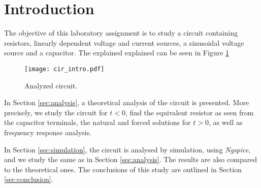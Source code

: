 \section{Introduction}
\label{sec:introduction}

The objective of this laboratory assignment is to study a circuit containing resistors, linearly dependent voltage and current sources, a sinusoidal voltage source and a capacitor. The explained explained can be seen in Figure \ref{fig:cir_intro}

\begin{figure}[H] \centering
\texttt{[image: cir\_intro.pdf]}
\caption{Analyzed circuit.}
\label{fig:cir_intro}
\end{figure}

In Section \ref{sec:analysis}, a theoretical analysis of the circuit is
presented. More precisely, we study the circuit for $t<0$, find the equivalent resistor as seen from the capacitor terminals, the natural and forced solutions for $t>0$, as well as frequency response analysis.

In Section \ref{sec:simulation}, the circuit is analysed by
simulation, using \textit{Ngspice}, and we study the same as in Section \ref{sec:analysis}. The results are also compared to the theoretical ones. The conclusions of this study are outlined in Section \ref{sec:conclusion}.
